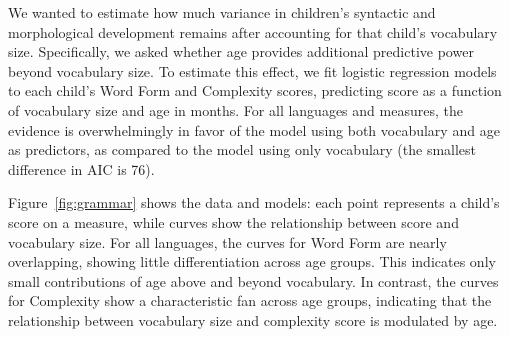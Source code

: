 \documentclass[10pt,letterpaper]{article}
\begin{document}
\begin{figure}
\centering
{}
\end{figure}

We wanted to estimate how much variance in children's syntactic and morphological development remains after accounting for that child's vocabulary size. Specifically, we asked whether age provides additional predictive power beyond vocabulary size. To estimate this effect, we fit logistic regression models to each child's Word Form and Complexity scores, predicting score as a function of vocabulary size and age in months. For all languages and measures, the evidence is overwhelmingly in favor of the model using both vocabulary and age as predictors, as compared to the model using only vocabulary (the smallest difference in AIC is 76). %

Figure~\ref{fig:grammar} shows the data and models: each point represents a child's score on a measure, while curves show the relationship between score and vocabulary size.
For all languages, the curves for Word Form are nearly overlapping, showing little differentiation across age groups. This indicates only small contributions of age above and beyond vocabulary. In contrast, the curves for Complexity show a characteristic fan across age groups, indicating that the relationship between vocabulary size and complexity score is modulated by age. %
\end{document}
